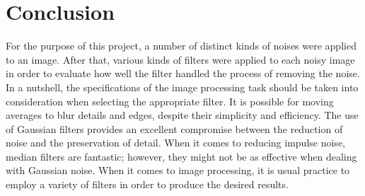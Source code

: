 \section{Conclusion }\label{P5}

For the purpose of this project, a number of distinct kinds of noises were applied to an image.
After that, various kinds of filters were applied to each noisy image in order to evaluate 
how well the filter handled the process of removing the noise. In a nutshell, 
the specifications of the image processing task should be taken into consideration 
when selecting the appropriate filter. It is possible for moving averages to blur details 
and edges, despite their simplicity and efficiency. The use of Gaussian filters provides 
an excellent compromise between the reduction of noise and the preservation of detail. 
When it comes to reducing impulse noise, median filters are fantastic; however, 
they might not be as effective when dealing with Gaussian noise. 
When it comes to image processing, it is usual practice to employ a variety of filters 
in order to produce the desired results.

